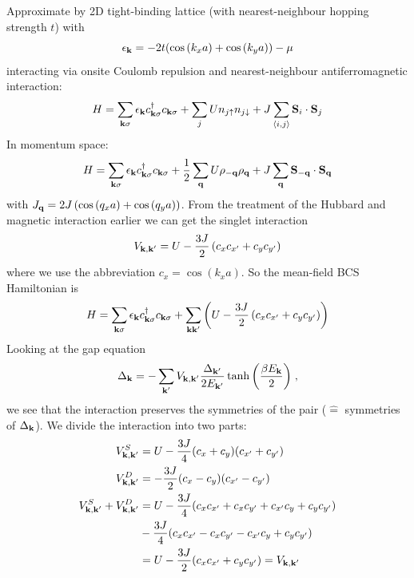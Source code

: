 \documentclass[../main.tex]{subfiles}
\begin{document}
Approximate by 2D tight-binding lattice (with nearest-neighbour hopping strength \(t\)) with
\begin{equation}
    \epsilon_{\bm{\mathrm{k}}} = -2t (\cos{(k_x a)} + \cos{(k_y a)}) - \mu
\end{equation}
interacting via onsite Coulomb repulsion and nearest-neighbour antiferromagnetic interaction:
\begin{equation}
    H = \sum_{\bm{\mathrm{k}} \sigma} \epsilon_{\bm{\mathrm{k}}} c_{\bm{\mathrm{k}} \sigma}^{\dagger} c_{\bm{\mathrm{k}} \sigma} + \sum_{j} U n_{j \uparrow} n_{j \downarrow} + J \sum_{\langle i, j \rangle} \bm{\mathrm{S}}_{i} \cdot \bm{\mathrm{S}}_{j}
\end{equation}
In momentum space:
\begin{equation}
    H = \sum_{\bm{\mathrm{k}} \sigma} \epsilon_{\bm{\mathrm{k}}} c_{\bm{\mathrm{k}} \sigma}^{\dagger} c_{\bm{\mathrm{k}} \sigma} + \frac{1}{2} \sum_{\bm{\mathrm{q}}} U \rho_{-\bm{\mathrm{q}}} \rho_{\bm{\mathrm{q}}} + J \sum_{\bm{\mathrm{q}}} \bm{\mathrm{S}}_{-{\bm{\mathrm{q}}}} \cdot \bm{\mathrm{S}}_{\bm{\mathrm{q}}}
\end{equation}
with \(J_{\bm{\mathrm{q}}} = 2 J \left( \cos{(q_x a)} + \cos{(q_y a)} \right)\).
From the treatment of the Hubbard and magnetic interaction earlier we can get the singlet interaction   
\begin{equation}
    V_{\bm{\mathrm{k}}, \bm{\mathrm{k}}^{\prime}} = U - \frac{3 J}{2} \left( c_x c_{x^{\prime}} + c_y c_{y^{\prime}} \right)
\end{equation}
where we use the abbreviation \(c_x = \cos{(k_x a)}\).
So the mean-field BCS Hamiltonian is
\begin{equation}
    H = \sum_{\bm{\mathrm{k}} \sigma} \epsilon_{\bm{\mathrm{k}}} c_{\bm{\mathrm{k}} \sigma}^{\dagger} c_{\bm{\mathrm{k}} \sigma} + \sum_{\bm{\mathrm{k}} \bm{\mathrm{k}}^{\prime}}\left( U - \frac{3 J}{2} \left( c_x c_{x^{\prime}} + c_y c_{y^{\prime}} \right) \right)
\end{equation}
Looking at the gap equation
\begin{equation}
    \Delta_{\bm{\mathrm{k}}} = - \sum_{\bm{\mathrm{k}}^{\prime}} V_{\bm{\mathrm{k}}, \bm{\mathrm{k}}^{\prime}}  \frac{\Delta_{\bm{\mathrm{k}}^{\prime}}}{2 E_{\bm{\mathrm{k}}^{\prime}}} \tanh{\left(\frac{\beta E_{\bm{\mathrm{k}}}}{2}\right)}
    \;,
\end{equation}
we see that the interaction preserves the symmetries of the pair (\(\hat{=}\) symmetries of \(\Delta_{\bm{\mathrm{k}}}\)).
We divide the interaction into two parts:
\begin{align}
    V_{\bm{\mathrm{k}}, \bm{\mathrm{k}}^{\prime}}^S &= U - \frac{3 J}{4} (c_x + c_y)(c_{x^{\prime}} + c_{y^{\prime}}) \\
    V_{\bm{\mathrm{k}}, \bm{\mathrm{k}}^{\prime}}^D &= -\frac{3 J}{2} (c_x - c_y)(c_{x^{\prime}} - c_{y^{\prime}}) \\
    V_{\bm{\mathrm{k}}, \bm{\mathrm{k}}^{\prime}}^S + V_{\bm{\mathrm{k}}, \bm{\mathrm{k}}^{\prime}}^D &= U - \frac{3 J}{4} (c_x c_{x^{\prime}} + c_x c_{y^{\prime}} + c_{x^{\prime}} c_y + c_y c_{y^{\prime}}) \\
    &- \frac{3 J}{4} (c_x c_{x^{\prime}} - c_x c_{y^{\prime}} - c_{x^{\prime}} c_y + c_y c_{y^{\prime}}) \\
    &= U - \frac{3 J}{2} (c_x c_{x^{\prime}} + c_y c_{y^{\prime}}) = V_{\bm{\mathrm{k}}, \bm{\mathrm{k}}^{\prime}}
\end{align}
\end{document}
